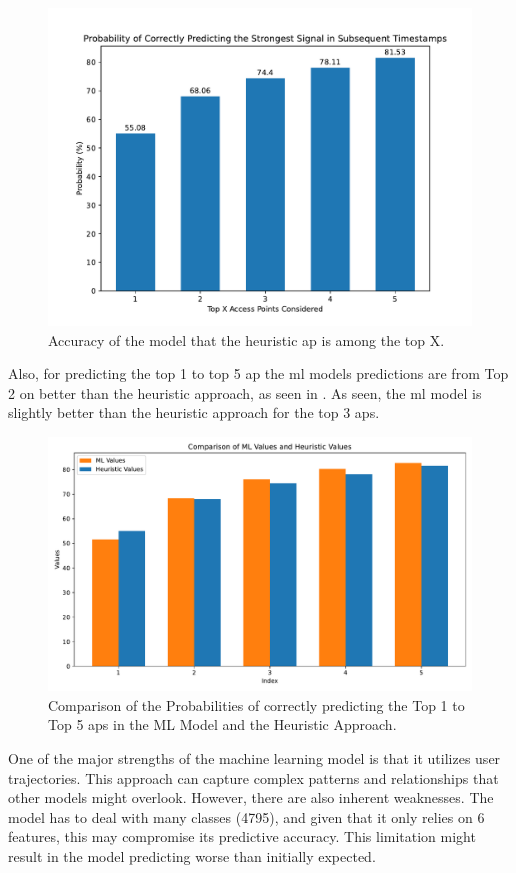 \begin{figure}[h]
    \centering
    \includegraphics*[scale=0.45]{images/heuristic_plot.pdf}
    \caption{Accuracy of the model that the heuristic \ac{ap} is among the top X.}
    \label{fig:heuristic-approach}
\end{figure}

Also, for predicting the top 1 to top 5 \ac{ap} the \ac{ml} models predictions are from Top 2 on better than the heuristic approach, as seen in .
As seen, the \ac{ml} model is slightly better than the heuristic approach for the top 3 \acp{ap}.

\begin{figure}[h]
    \centering
    \includegraphics*[scale=0.45]{images/comparison_ml_heuristic_1_to_5.pdf}
    \caption{Comparison of the Probabilities of correctly predicting the Top 1 to Top 5 \acp{ap} in the ML Model and the Heuristic Approach.}
    \label{fig:comparison_ml_heuristic_1_to_5}
\end{figure}

One of the major strengths of the machine learning model is that it utilizes user trajectories.
This approach can capture complex patterns and relationships that other models might overlook.
However, there are also inherent weaknesses.
The model has to deal with many classes (4795), and given that it only relies on 6 features, this may compromise its predictive accuracy.
This limitation might result in the model predicting worse than initially expected.
